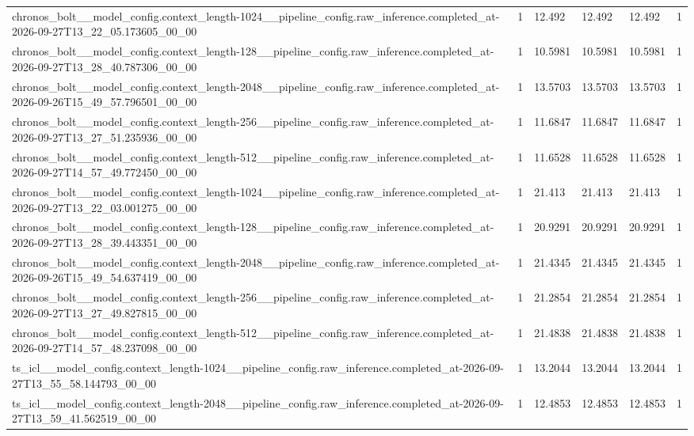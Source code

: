 \begin{tabular}{llllll}
chronos\_bolt\_\_model\_config.context\_length-1024\_\_pipeline\_config.raw\_inference.completed\_at-2026-09-27T13\_22\_05.173605\_00\_00 & 1 & 12.492 & 12.492 & 12.492 & 1 \\
chronos\_bolt\_\_model\_config.context\_length-128\_\_pipeline\_config.raw\_inference.completed\_at-2026-09-27T13\_28\_40.787306\_00\_00 & 1 & 10.5981 & 10.5981 & 10.5981 & 1 \\
chronos\_bolt\_\_model\_config.context\_length-2048\_\_pipeline\_config.raw\_inference.completed\_at-2026-09-26T15\_49\_57.796501\_00\_00 & 1 & 13.5703 & 13.5703 & 13.5703 & 1 \\
chronos\_bolt\_\_model\_config.context\_length-256\_\_pipeline\_config.raw\_inference.completed\_at-2026-09-27T13\_27\_51.235936\_00\_00 & 1 & 11.6847 & 11.6847 & 11.6847 & 1 \\
chronos\_bolt\_\_model\_config.context\_length-512\_\_pipeline\_config.raw\_inference.completed\_at-2026-09-27T14\_57\_49.772450\_00\_00 & 1 & 11.6528 & 11.6528 & 11.6528 & 1 \\
chronos\_bolt\_\_model\_config.context\_length-1024\_\_pipeline\_config.raw\_inference.completed\_at-2026-09-27T13\_22\_03.001275\_00\_00 & 1 & 21.413 & 21.413 & 21.413 & 1 \\
chronos\_bolt\_\_model\_config.context\_length-128\_\_pipeline\_config.raw\_inference.completed\_at-2026-09-27T13\_28\_39.443351\_00\_00 & 1 & 20.9291 & 20.9291 & 20.9291 & 1 \\
chronos\_bolt\_\_model\_config.context\_length-2048\_\_pipeline\_config.raw\_inference.completed\_at-2026-09-26T15\_49\_54.637419\_00\_00 & 1 & 21.4345 & 21.4345 & 21.4345 & 1 \\
chronos\_bolt\_\_model\_config.context\_length-256\_\_pipeline\_config.raw\_inference.completed\_at-2026-09-27T13\_27\_49.827815\_00\_00 & 1 & 21.2854 & 21.2854 & 21.2854 & 1 \\
chronos\_bolt\_\_model\_config.context\_length-512\_\_pipeline\_config.raw\_inference.completed\_at-2026-09-27T14\_57\_48.237098\_00\_00 & 1 & 21.4838 & 21.4838 & 21.4838 & 1 \\
ts\_icl\_\_model\_config.context\_length-1024\_\_pipeline\_config.raw\_inference.completed\_at-2026-09-27T13\_55\_58.144793\_00\_00 & 1 & 13.2044 & 13.2044 & 13.2044 & 1 \\
ts\_icl\_\_model\_config.context\_length-2048\_\_pipeline\_config.raw\_inference.completed\_at-2026-09-27T13\_59\_41.562519\_00\_00 & 1 & 12.4853 & 12.4853 & 12.4853 & 1 \\

\end{tabular}

